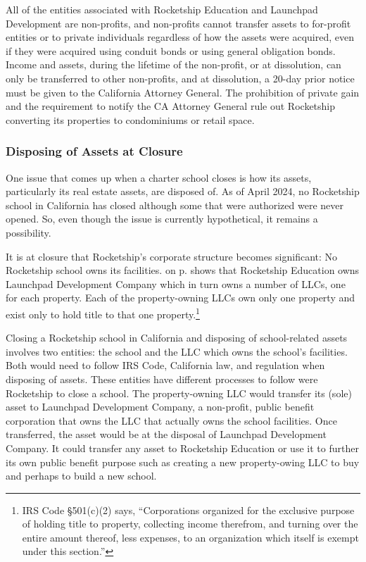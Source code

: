 All of the entities associated with Rocketship Education and Launchpad Development are non-profits, and non-profits cannot transfer assets to for-profit entities or to private individuals regardless of how the assets were acquired, even if they were acquired using conduit bonds or using general obligation bonds. Income and assets, during the lifetime of the non-profit, or at dissolution, can only be transferred to other non-profits, and at dissolution, a 20-day prior notice must be given to the California Attorney General. The prohibition of private gain and the requirement to notify the CA Attorney General rule out Rocketship converting its properties to condominiums or retail space.

\subsubsection{Disposing of Assets at Closure}%
\label{sec:disposal-assets-closure}

One issue that comes up when a charter school closes is how its assets, particularly its real estate assets, are disposed of. As of April 2024, no Rocketship school in California has closed although some that were authorized were never opened. So, even though the issue is currently hypothetical, it remains a possibility.

It is at closure that Rocketship's corporate structure becomes significant: No Rocketship school owns its facilities.  on p.\pageref{fig:corporate-structure} shows that Rocketship Education owns Launchpad Development Company which in turn owns a number of LLCs, one for each property. Each of the property-owning LLCs own only one property and exist only to hold title to that one property.\footnote{IRS Code §501(c)(2) says, ``Corporations organized for the exclusive purpose of holding title to property, collecting income therefrom, and turning over the entire amount thereof, less expenses, to an organization which itself is exempt under this section.''}

Closing a Rocketship school in California and disposing of school-related assets involves two entities: the school and the LLC which owns the school's facilities. Both would need to follow IRS Code, California law, and regulation when disposing of assets. These entities have different processes to follow were Rocketship to close a school. The property-owning LLC would transfer its (sole) asset to Launchpad Development Company, a non-profit, public benefit corporation that owns the LLC that actually owns the school facilities. Once transferred, the asset would be at the disposal of Launchpad Development Company. It could transfer any asset to Rocketship Education or use it to further its own public benefit purpose such as creating a new property-owing LLC to buy and perhaps to build a new school.

